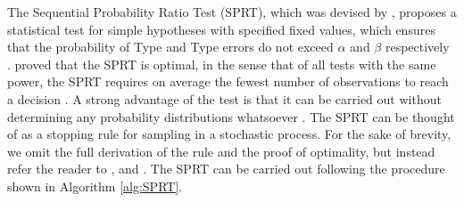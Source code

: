 The Sequential Probability Ratio Test (SPRT), which was devised by \citeauthor{Wald1945SequentialHypotheses}, proposes a statistical test for simple hypotheses with specified fixed values, which ensures that the probability of Type  and Type  errors do not exceed $\alpha$ and $\beta$ respectively \cite{Wald1945SequentialHypotheses}. \citeauthor{Wald1948OptimumTest} proved that the SPRT is optimal, in the sense that of all tests with the same power, the SPRT requires on average the fewest number of observations to reach a decision \cite{Wald1948OptimumTest}. A strong advantage of the test is that it can be carried out without determining any probability distributions whatsoever \cite{Wald1945SequentialHypotheses}. The SPRT can be thought of as a stopping rule for sampling in a stochastic process. For the sake of brevity, we omit the full derivation of the rule and the proof of optimality, but instead refer the reader to \cite{Wald1945SequentialHypotheses}, \cite{Wald1950BayesProblems} and \cite{Wald1948OptimumTest}. The SPRT can be carried out following the procedure shown in Algorithm \ref{alg:SPRT}.




